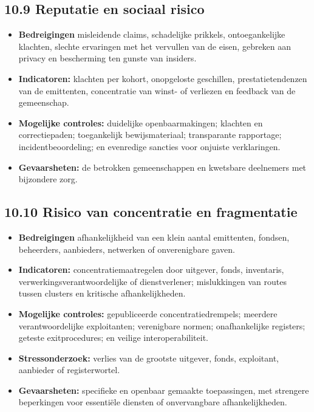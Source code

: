 \documentclass[11pt]{article}
\begin{document}
\subsection*{10.9 Reputatie en sociaal risico}

\begin{itemize}[leftmargin=*]
\item \textbf{Bedreigingen} misleidende claims, schadelijke prikkels, ontoegankelijke klachten, slechte ervaringen met het vervullen van de eisen, gebreken aan privacy en bescherming ten gunste van insiders.
\item \textbf{Indicatoren:} klachten per kohort, onopgeloste geschillen, prestatietendenzen van de emittenten, concentratie van winst- of verliezen en feedback van de gemeenschap.
\item \textbf{Mogelijke controles:} duidelijke openbaarmakingen; klachten en correctiepaden; toegankelijk bewijsmateriaal; transparante rapportage; incidentbeoordeling; en evenredige sancties voor onjuiste verklaringen.
\item \textbf{Gevaarsheten:} de betrokken gemeenschappen en kwetsbare deelnemers met bijzondere zorg.
\end{itemize}
\subsection*{10.10 Risico van concentratie en fragmentatie}

\begin{itemize}[leftmargin=*]
\item \textbf{Bedreigingen} afhankelijkheid van een klein aantal emittenten, fondsen, beheerders, aanbieders, netwerken of onverenigbare gaven.
\item \textbf{Indicatoren:} concentratiemaatregelen door uitgever, fonds, inventaris, verwerkingsverantwoordelijke of dienstverlener; mislukkingen van routes tussen clusters en kritische afhankelijkheden.
\item \textbf{Mogelijke controles:} gepubliceerde concentratiedrempels; meerdere verantwoordelijke exploitanten; verenigbare normen; onafhankelijke registers; geteste exitprocedures; en veilige interoperabiliteit.
\item \textbf{Stressonderzoek:} verlies van de grootste uitgever, fonds, exploitant, aanbieder of registerwortel.
\item \textbf{Gevaarsheten:} specifieke en openbaar gemaakte toepassingen, met strengere beperkingen voor essentiële diensten of onvervangbare afhankelijkheden.
\end{itemize}
\end{document}
